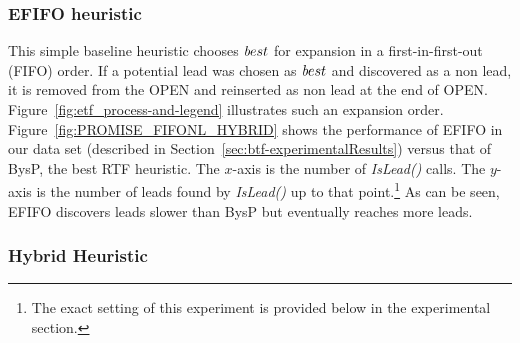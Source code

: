 \documentclass[prodmode,acmtecs]{acmsmall} %
\newcommand{\islead}[1]{{\em IsLead(#1)}}
\newcommand{\best}{{\textit best}}
\begin{document}


\subsubsection{EFIFO heuristic}
This simple baseline heuristic chooses $\best$ for expansion in a first-in-first-out (FIFO) order. If a potential
lead was chosen as $\best$ and discovered as a non lead, it is removed from the OPEN and reinserted as non lead at the end of OPEN. 
Figure~\ref{fig:etf_process-and-legend} illustrates such an expansion order. Figure~\ref{fig:PROMISE_FIFONL_HYBRID} shows the performance of EFIFO in our data set (described in Section~\ref{sec:btf-experimentalResults}) versus that of BysP, the best RTF heuristic. The $x$-axis is the number of \islead{}
calls. The $y$-axis is the number of leads found by \islead{} up to that point.\footnote{The exact setting of this experiment is provided below in the experimental section.} As can be seen, EFIFO discovers leads slower than BysP but eventually reaches more leads.


\subsubsection{Hybrid Heuristic}
\end{document}
